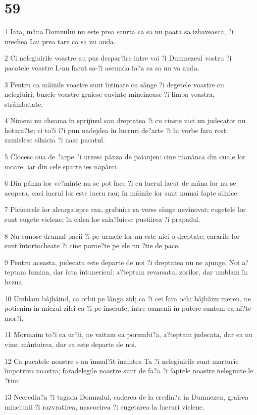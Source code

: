 \chapter{59}

\par 1 Iata, mâna Domnului nu este prea scurta ca sa nu poata sa izbaveasca, ?i urechea Lui prea tare ca sa nu auda.
\par 2 Ci nelegiuirile voastre au pus despar?ire intre voi ?i Dumnezeul vostru ?i pacatele voastre L-au facut sa-?i ascunda fa?a ca sa nu va auda.
\par 3 Pentru ca mâinile voastre sunt întinate cu sânge ?i degetele voastre cu nelegiuiri; buzele voastre graiesc cuvinte mincinoase ?i limba voastra, strâmbatate.
\par 4 Nimeni nu cheama în sprijinul sau dreptatea ?i cu cinste nici un judecator nu hotara?te; ci to?i î?i pun nadejdea în lucruri de?arte ?i în vorbe fara rost: zamislesc silnicia ?i nasc pacatul.
\par 5 Clocesc oua de ?arpe ?i urzesc pânza de paianjen: cine manânca din ouale lor moare, iar din cele sparte ies napârci.
\par 6 Din pânza lor ve?minte nu se pot face ?i cu lucrul facut de mâna lor nu se acopera, caci lucrul lor este lucru rau; în mâinile lor sunt numai fapte silnice.
\par 7 Picioarele lor alearga spre rau, grabnice sa verse sânge nevinovat; cugetele lor sunt cugete viclene; în calea lor sala?luiesc pustiirea ?i prapadul.
\par 8 Nu cunosc drumul pacii ?i pe urmele lor nu este nici o dreptate; cararile lor sunt întortocheate ?i cine porne?te pe ele nu ?tie de pace.
\par 9 Pentru aceasta, judecata este departe de noi ?i dreptatea nu ne ajunge. Noi a?teptam lumina, dar iata întunericul; a?teptam revarsatul zorilor, dar umblam în bezna.
\par 10 Umblam bâjbâind, ca orbii pe lânga zid; ca ?i cei fara ochi bâjbâim mereu, ne poticnim în miezul zilei ca ?i pe înserate; între oamenii în putere suntem ca ni?te mor?i.
\par 11 Mormaim to?i ca ur?ii, ne vaitam ca porumbi?a, a?teptam judecata, dar ea nu vine; mântuirea, dar ea este departe de noi.
\par 12 Ca pacatele noastre s-au înmul?it înaintea Ta ?i nelegiuirile sunt marturie împotriva noastra; faradelegile noastre sunt de fa?a ?i faptele noastre nelegiuite le ?tim:
\par 13 Necredin?a ?i tagada Domnului, caderea de la credin?a în Dumnezeu, grairea minciunii ?i razvratirea, nascocirea ?i cugetarea la lucruri viclene.
